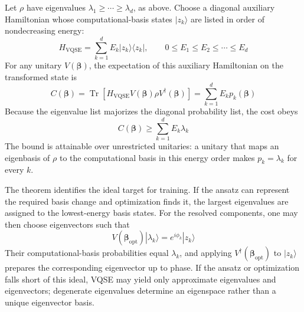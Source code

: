 \begin{theorem}
    Let $\rho$ have eigenvalues $\lambda_1\geq\cdots\geq\lambda_d$, as above. Choose a diagonal auxiliary Hamiltonian whose computational-basis states $|z_k\rangle$ are listed in order of nondecreasing energy:
    \begin{equation}
        H_{\mathrm{VQSE}}=\sum_{k=1}^{d}E_k|z_k\rangle\langle z_k|,
        \qquad 0\leq E_1\leq E_2\leq\cdots\leq E_d
    \end{equation}
    For any unitary $V(\boldsymbol{\beta})$, the expectation of this auxiliary Hamiltonian on the transformed state is
    \begin{equation}
        C(\boldsymbol{\beta})
        =\operatorname{Tr}\!\left[H_{\mathrm{VQSE}}
            V(\boldsymbol{\beta})\rho V^\dagger(\boldsymbol{\beta})\right]
        =\sum_{k=1}^{d}E_kp_k(\boldsymbol{\beta})
        \label{eq:vqse_cost_dot_product}
    \end{equation}
    Because the eigenvalue list majorizes the diagonal probability list, the cost obeys
    \begin{equation}
        C(\boldsymbol{\beta})\geq\sum_{k=1}^{d}E_k\lambda_k
        \label{eq:vqse_cost_lower_bound}
    \end{equation}
    The bound is attainable over unrestricted unitaries: a unitary that maps an eigenbasis of $\rho$ to the computational basis in this energy order makes $p_k=\lambda_k$ for every $k$.
\end{theorem}

\begin{remark}
    The theorem identifies the ideal target for training. If the ansatz can represent the required basis change and optimization finds it, the largest eigenvalues are assigned to the lowest-energy basis states. For the resolved components, one may then choose eigenvectors such that
    \begin{equation}
        V(\boldsymbol{\beta}_{\mathrm{opt}})|\lambda_k\rangle
        =e^{i\phi_k}|z_k\rangle
        \label{eq:vqse_eigenvector_mapping}
    \end{equation}
    Their computational-basis probabilities equal $\lambda_k$, and applying $V^\dagger(\boldsymbol{\beta}_{\mathrm{opt}})$ to $|z_k\rangle$ prepares the corresponding eigenvector up to phase. If the ansatz or optimization falls short of this ideal, VQSE may yield only approximate eigenvalues and eigenvectors; degenerate eigenvalues determine an eigenspace rather than a unique eigenvector basis.
\end{remark}

